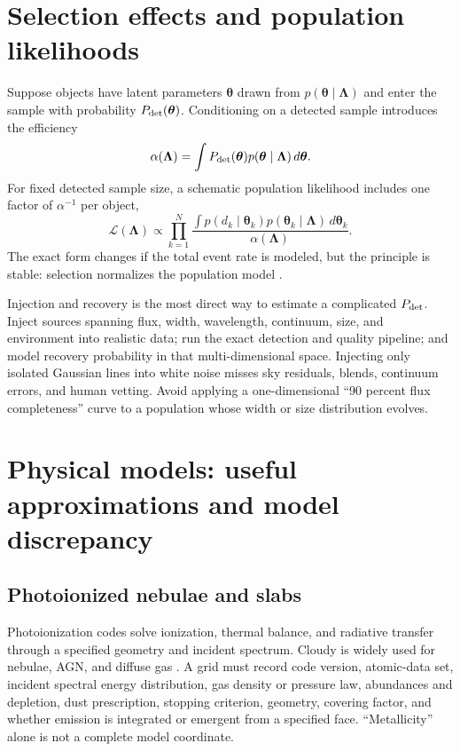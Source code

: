 \section{Selection effects and population likelihoods}

Suppose objects have latent parameters $\boldsymbol{\theta}$ drawn from
$p(\boldsymbol{\theta}\mid\boldsymbol{\Lambda})$ and enter the sample with
probability $P_{\rm det}(\boldsymbol{\theta})$.  Conditioning on a detected
sample introduces the efficiency
\begin{equation}
 \alpha(\boldsymbol{\Lambda})=
 \int P_{\rm det}(\boldsymbol{\theta})
 p(\boldsymbol{\theta}\mid\boldsymbol{\Lambda})\,d\boldsymbol{\theta}.
 \label{eq:selection-efficiency}
\end{equation}
For fixed detected sample size, a schematic population likelihood includes one
factor of $\alpha^{-1}$ per object,
\begin{equation}
 \mathcal{L}(\boldsymbol{\Lambda})\propto
 \prod_{k=1}^{N}\frac{
 \int p(d_k\mid\boldsymbol{\theta}_k)
 p(\boldsymbol{\theta}_k\mid\boldsymbol{\Lambda})\,d\boldsymbol{\theta}_k}
 {\alpha(\boldsymbol{\Lambda})}.
 \label{eq:population-selection}
\end{equation}
The exact form changes if the total event rate is modeled, but the principle is
stable: selection normalizes the population model \citep{MandelFarrGair2019}.

Injection and recovery is the most direct way to estimate a complicated
$P_{\rm det}$.  Inject sources spanning flux, width, wavelength, continuum,
size, and environment into realistic data; run the exact detection and quality
pipeline; and model recovery probability in that multi-dimensional space.
Injecting only isolated Gaussian lines into white noise misses sky residuals,
blends, continuum errors, and human vetting.  Avoid applying a one-dimensional
``90 percent flux completeness'' curve to a population whose width or size
distribution evolves.

\section{Physical models: useful approximations and model discrepancy}

\subsection{Photoionized nebulae and slabs}

Photoionization codes solve ionization, thermal balance, and radiative transfer
through a specified geometry and incident spectrum.  Cloudy is widely used for
nebulae, AGN, and diffuse gas \citep{Ferland2017}.  A grid must record code
version, atomic-data set, incident spectral energy distribution, gas density or
pressure law, abundances and depletion, dust prescription, stopping criterion,
geometry, covering factor, and whether emission is integrated or emergent from
a specified face.  ``Metallicity'' alone is not a complete model coordinate.

